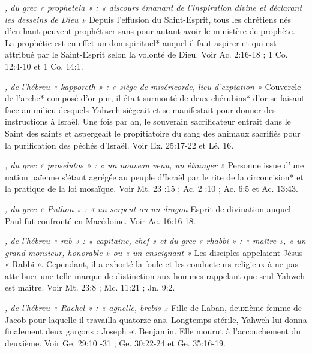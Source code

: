 \begin{multicols}{2}
\textit{, du grec « propheteia » : « discours émanant de l'inspiration divine et déclarant les desseins de Dieu »}\newline
Depuis l'effusion du Saint-Esprit, tous les chrétiens nés d'en haut peuvent prophétiser sans pour autant avoir le ministère de prophète. La prophétie est en effet un don spirituel* auquel il faut aspirer et qui est attribué par le Saint-Esprit selon la volonté de Dieu. Voir Ac. 2:16-18 ; 1 Co. 12:4-10 et 1 Co. 14:1.

\textit{, de l'hébreu « kapporeth » : « siège de miséricorde, lieu d'expiation »}\newline
Couvercle de l'arche* composé d'or pur, il était surmonté de deux chérubins* d'or se faisant face au milieu desquels Yahweh siégeait et se manifestait pour donner des instructions à Israël. Une fois par an, le souverain sacrificateur entrait dans le Saint des saints et aspergeait le propitiatoire du sang des animaux sacrifiés pour la purification des péchés d'Israël. Voir Ex. 25:17-22 et Lé. 16.

\textit{, du grec « proselutos » : « un nouveau venu, un étranger »}\newline
Personne issue d'une nation païenne s'étant agrégée au peuple d'Israël par le rite de la circoncision* et la pratique de la loi mosaïque. Voir Mt. 23 :15 ; Ac. 2 :10 ; Ac. 6:5 et Ac. 13:43.

\textit{, du grec « Puthon » : « un serpent ou un dragon}\newline
Esprit de divination auquel Paul fut confronté en Macédoine. Voir Ac. 16:16-18.

\textit{, de l'hébreu « rab » : « capitaine, chef » et du grec « rhabbi » : « maître », « un grand monsieur, honorable » ou « un enseignant »}\newline
Les disciples appelaient Jésus « Rabbi ». Cependant, il a exhorté la foule et les conducteurs religieux à ne pas attribuer une telle marque de distinction aux hommes rappelant que seul Yahweh est maître. Voir Mt. 23:8 ; Mc. 11:21 ; Jn. 9:2.

\textit{, de l'hébreu « Rachel » : « agnelle, brebis »}\newline
Fille de Laban, deuxième femme de Jacob pour laquelle il travailla quatorze ans. Longtemps stérile, Yahweh lui donna finalement deux garçons : Joseph et Benjamin. Elle mourut à l'accouchement du deuxième. Voir Ge. 29:10 -31 ; Ge. 30:22-24 et Ge. 35:16-19.


\end{multicols}
